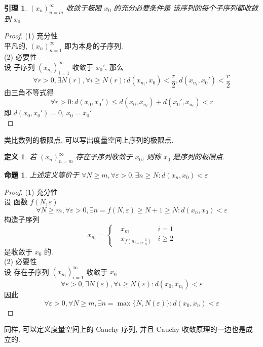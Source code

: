 \documentclass[12pt, a4paper, oneside]{ctexart}
\newtheorem{definition}[theorem]{定义}
\newtheorem{lemma}[theorem]{引理}
\newtheorem{proposition}[theorem]{命题}
\begin{document}
\begin{lemma}
    $(x_n)_{n=m}^{\infty}$ 收敛于极限 $x_0$ 的充分必要条件是 该序列的每个子序列都收敛到 $x_0$
\end{lemma}
\begin{proof}
    (1) 充分性\\
        平凡的, $(x_n)_{n=1}^{\infty}$ 即为本身的子序列.\\
    (2) 必要性\\
    设 子序列 $(x_{n_i})_{i=1}^{\infty}$ 收敛于 $x_0'$, 那么
    $$
        \forall r>0,\exists N(r),\forall i\geq N(r):d(x_{n_i}, x_0)<\frac r2, d(x_{n_i}, x_0')< \frac r2
    $$
    由三角不等式得
    $$
        \forall r > 0:d(x_0,x_0')\leq d(x_0, x_{n_i})+d(x_0', x_{n_i})<r
    $$
    即 $d(x_0, x_0')=0$, $x_0=x_0'$\\
\end{proof}

类比数列的极限点, 可以写出度量空间上序列的极限点.

\begin{definition}
    若 $(x_n)_{n=m}^{\infty}$ 存在子序列收敛于 $x_0$, 则称 $x_0$ 是序列的极限点.
\end{definition}
\begin{proposition}
    上述定义等价于 $\forall N \geq m, \forall \varepsilon > 0, \exists n \geq N : d(x_n, x_0)<\varepsilon$
\end{proposition}
\begin{proof}
    (1) 充分性\\
        设 函数 $f(N, \varepsilon)$
        $$
            \forall N\geq m, \forall \varepsilon > 0, \exists n=f(N, \varepsilon)\geq N+1\geq N:d(x_n,x_0)<\varepsilon
        $$
        构造子序列
        $$
            x_{n_i}=\left\{\begin{aligned}
                & x_m & i=1\\
                & x_{f(n_{i-1}, \frac1n)} & i\geq 2
            \end{aligned}\right.
        $$
        是收敛于 $x_0$ 的.\\
    (2) 必要性\\
    设 存在子序列 $(x_{n_i})_{i=1}^{\infty}$ 收敛于 $x_0$
    $$
        \forall \varepsilon > 0, \exists N(\varepsilon),\forall i\geq N(\varepsilon):d(x_0, x_{n_i})<\varepsilon
    $$
    因此
    $$
        \forall \varepsilon > 0, \forall N \geq m, \exists n=\max\{N, N(\varepsilon)\}:d(x_0, x_n)<\varepsilon
    $$
\end{proof}

同样, 可以定义度量空间上的 Cauchy 序列, 并且 Cauchy 收敛原理的一边也是成立的.
\end{document}
